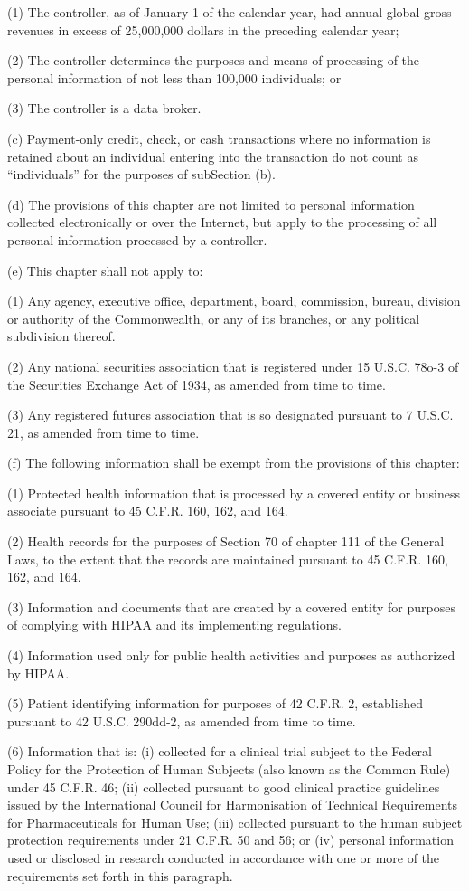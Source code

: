 (1) The controller, as of January 1 of the calendar year, had annual global gross revenues in excess of 25,000,000 dollars in the preceding calendar year;

(2) The controller determines the purposes and means of processing of the personal information of not less than 100,000 individuals; or

(3) The controller is a data broker.

(c) Payment-only credit, check, or cash transactions where no information is retained about an individual entering into the transaction do not count as “individuals” for the purposes of subSection (b).

(d) The provisions of this chapter are not limited to personal information collected electronically or over the Internet, but apply to the processing of all personal information processed by a controller.

(e) This chapter shall not apply to:

(1) Any agency, executive office, department, board, commission, bureau, division or authority of the Commonwealth, or any of its branches, or any political subdivision thereof.

(2) Any national securities association that is registered under 15 U.S.C. 78o-3 of the Securities Exchange Act of 1934, as amended from time to time.

(3) Any registered futures association that is so designated pursuant to 7 U.S.C. 21, as amended from time to time.

(f) The following information shall be exempt from the provisions of this chapter:

(1) Protected health information that is processed by a covered entity or business associate pursuant to 45 C.F.R. 160, 162, and 164.

(2) Health records for the purposes of Section 70 of chapter 111 of the General Laws, to the extent that the records are maintained pursuant to 45 C.F.R. 160, 162, and 164.

(3) Information and documents that are created by a covered entity for purposes of complying with HIPAA and its implementing regulations.

(4) Information used only for public health activities and purposes as authorized by HIPAA.

(5) Patient identifying information for purposes of 42 C.F.R. 2, established pursuant to 42 U.S.C. 290dd-2, as amended from time to time.

(6) Information that is: (i) collected for a clinical trial subject to the Federal Policy for the Protection of Human Subjects (also known as the Common Rule) under 45 C.F.R. 46; (ii) collected pursuant to good clinical practice guidelines issued by the International Council for Harmonisation of Technical Requirements for Pharmaceuticals for Human Use; (iii) collected pursuant to the human subject protection requirements under 21 C.F.R. 50 and 56; or (iv) personal information used or disclosed in research conducted in accordance with one or more of the requirements set forth in this paragraph.

